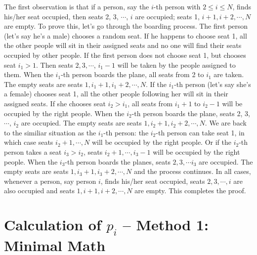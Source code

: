 \documentclass[11pt]{article}
\newcommand{\ve}[1]{\mbox{\boldmath $#1$}}
\numberwithin{equation}{section}
\begin{document}
The first observation is that if a person, say the $i$-th person 
with $2 \leq i \leq N$, finds his/her seat occupied, then seats 2, 3, 
$\cdots$, $i$ are occupied; seats 1, $i+1, i+2, \cdots, N$ are 
empty. To prove this, let's go through the boarding process. 
The first person (let's say he's a male) chooses a random seat. If he happens to choose 
seat 1, all the other people will sit in their assigned seats and 
no one will find their seats occupied by other people. If the 
first person does not choose seat 1, but chooses seat $i_1 > 1$. Then seats 
$2, 3, \cdots$, $i_1-1$ will be taken by the people assigned to them. 
When the $i_1$-th person boards the plane, all seats from 2 to $i_1$ 
are taken. The empty seats are seats $1, i_1+1, i_1+2, \cdots, N$. If the $i_1$-th person 
(let's say she's a female)
chooses seat 1, all the other people following her will sit in their assigned seats. 
If she chooses seat $i_2 > i_1$, all seats from $i_1+1$ to $i_2-1$ will be 
occupied by the right people. When the $i_2$-th person boards the plane, 
seats 2, 3, $\cdots$, $i_2$ are occupied. The empty seats are seats $1, i_2+1, i_2+2, 
\cdots, N$. We are back to the similiar situation as the $i_1$-th person: 
the $i_2$-th person can take seat 1, in which case seats $i_2+1, \cdots, N$ will be 
occupied by the right people. Or if the $i_2$-th person takes a seat $i_3 > i_2$, 
seats $i_2+1, \cdots, i_3-1$ will be occupied by the right people. When the $i_3$-th 
person boards the planes, seats $2, 3, \cdots i_3$ are occupied. The empty seats 
are seats $1, i_3+1, i_3+2, \cdots, N$ and the process continues. In all cases, 
whenever a person, say person $i$, finds his/her seat occupied, seats $2, 3, \cdots, i$ 
are also occupied and seats $1, i+1,i+2,\cdots, N$ are empty. This completes the proof.

\section{Calculation of \ve{p_i} -- Method 1: Minimal Math}
\end{document}
